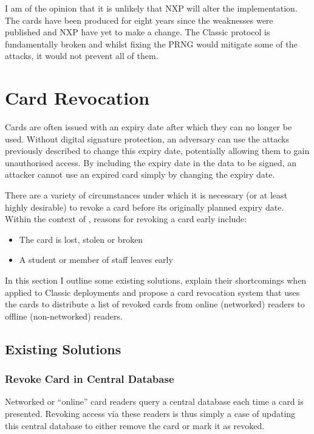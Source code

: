 \documentclass[dissertation.tex]{subfiles}
\begin{document}
  I am of the opinion that it is unlikely that NXP will alter the implementation. The cards have been produced for eight years since the weaknesses were published and NXP have yet to make a change. The \mifare{} Classic protocol is fundamentally broken and whilst fixing the PRNG would mitigate some of the attacks, it would not prevent all of them.

  \section{Card Revocation}
  Cards are often issued with an expiry date after which they can no longer be used. Without digital signature protection, an adversary can use the attacks previously described to change this expiry date, potentially allowing them to gain unauthorised access. By including the expiry date in the data to be signed, an attacker cannot use an expired card simply by changing the expiry date.

  There are a variety of circumstances under which it is necessary (or at least highly desirable) to revoke a card before its originally planned expiry date. Within the context of \UoC{}, reasons for revoking a card early include:

  \begin{itemize}
    \item The card is lost, stolen or broken
    \item A student or member of staff leaves early
  \end{itemize}

  In this section I outline some existing solutions, explain their shortcomings when applied to \mifare{} Classic deployments and propose a card revocation system that uses the cards to distribute a list of revoked cards from online (networked) readers to offline (non-networked) readers.

  \subsection{Existing Solutions}
  \subsubsection{Revoke Card in Central Database}

  Networked or ``online'' card readers query a central database each time a card is presented. Revoking access via these readers is thus simply a case of updating this central database to either remove the card or mark it as revoked.
\end{document}
